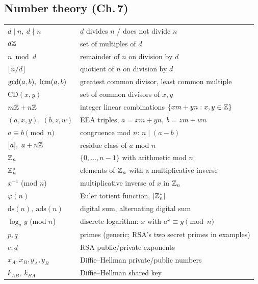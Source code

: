 \subsection*{Number theory (Ch.\,7)}
\begin{longtable}{ll}
$d\mid n,\ d\nmid n$ & $d$ divides $n$ / does not divide $n$ \\
$d\mathbb{Z}$ & set of multiples of $d$ \\
$n\bmod d$ & remainder of $n$ on division by $d$ \\
$\lfloor n/d\rfloor$ & quotient of $n$ on division by $d$ \\
$\gcd(a,b),\ \lcmop(a,b)$ & greatest common divisor, least common multiple \\
$\mathrm{CD}(x,y)$ & set of common divisors of $x,y$ \\
$m\mathbb{Z}+n\mathbb{Z}$ & integer linear combinations $\{xm+yn : x,y\in\mathbb{Z}\}$ \\
$(a,x,y),\ (b,z,w)$ & EEA triples, $a=xm+yn,\ b=zm+wn$ \\
$a\equiv b\pmod n$ & congruence mod $n$: $n\mid(a-b)$ \\
$[a],\ a+n\Z$ & residue class of $a$ mod $n$ \\
$\mathbb{Z}_n$ & $\{0,\dots,n-1\}$ with arithmetic mod $n$ \\
$\mathbb{Z}_n^*$ & elements of $\mathbb{Z}_n$ with a multiplicative inverse \\
$x^{-1}$ (mod $n$) & multiplicative inverse of $x$ in $\mathbb{Z}_n$ \\
$\varphi(n)$ & Euler totient function, $|\mathbb{Z}_n^*|$ \\
$\mathrm{ds}(n),\ \mathrm{ads}(n)$ & digital sum, alternating digital sum \\
$\log_a y$ (mod $n$) & discrete logarithm: $x$ with $a^x\equiv y\pmod n$ \\
$p,q$ & primes (generic; RSA's two secret primes in examples) \\
$e,d$ & RSA public/private exponents \\
$x_A,x_B,y_A,y_B$ & Diffie--Hellman private/public numbers \\
$k_{AB},\ k_{BA}$ & Diffie--Hellman shared key \\
\end{longtable}

